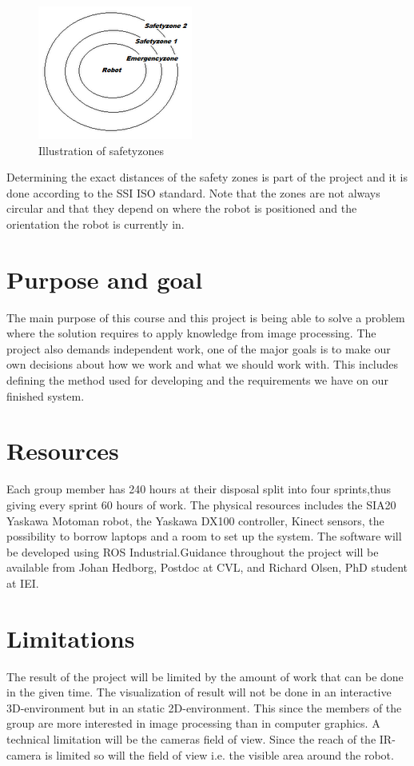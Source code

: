 \documentclass[10pt,a4paper]{article}
\begin{document}
\begin{figure}[H] 
  \centering
    \includegraphics{safetyzones.png}
    \caption{Illustration of safetyzones}
    \label{fig:safetyzone}
\end{figure}

Determining the exact distances of the safety zones is part of the project and it is done according to the SSI ISO standard. Note that the zones are not always circular and that they depend on where the robot is positioned and the orientation the robot is currently in.

\section{Purpose and goal}
The main purpose of this course and this project is being able to solve a problem where the solution requires to apply knowledge from image processing. The project also demands independent work, one of the major goals is to make our own decisions about how we work and what we should work with. This includes defining the method used for developing and the requirements we have on our finished system.

\section{Resources}
Each group member has 240 hours at their disposal split into four sprints,thus giving every sprint 60 hours of work. The physical resources includes the SIA20 Yaskawa Motoman robot, the Yaskawa DX100 controller, Kinect sensors, the possibility to borrow laptops and a room to set up the system. The software will be developed using ROS Industrial.Guidance throughout the project will be available from Johan Hedborg, Postdoc at CVL, and Richard Olsen, PhD student at IEI. 

\section{Limitations}
The result of the project will be limited by the amount of work that can be done in the given time. The visualization of result will not be done in an interactive 3D-environment but in an static 2D-environment. This since the members of the group are more interested in image processing than in computer graphics. A technical limitation will be the cameras field of view. Since the reach of the IR-camera is limited so will the field of view i.e. the visible area around the robot. 
\end{document}
